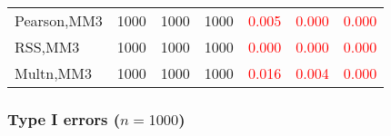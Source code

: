 \documentclass[
]{article}
\begin{document}
\begin{table}[H]
{\begin{tabular}[t]{lrrrrrr}
\hspace{1em}Pearson,MM3 & 1000 & 1000 & 1000 & \textcolor{red}{0.005} & \textcolor{red}{0.000} & \textcolor{red}{0.000}\\
\hspace{1em}RSS,MM3 & 1000 & 1000 & 1000 & \textcolor{red}{0.000} & \textcolor{red}{0.000} & \textcolor{red}{0.000}\\
\hspace{1em}Multn,MM3 & 1000 & 1000 & 1000 & \textcolor{red}{0.016} & \textcolor{red}{0.004} & \textcolor{red}{0.000}\\
\bottomrule
\end{tabular}}
\endgroup{}
\end{table}

\hypertarget{type-i-errors-n1000-3}{%
\subsubsection{\texorpdfstring{Type I errors
(\(n=1000\))}{Type I errors (n=1000)}}\label{type-i-errors-n1000-3}}
\end{document}
